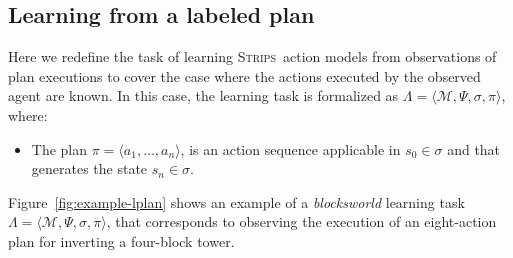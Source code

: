 \documentclass[3p,times]{elsarticle}
\newcommand{\strips}{\textsc{Strips}}     %
\newcommand{\tup}[1]{{\langle #1 \rangle}}
\begin{document}
\subsection{Learning from a labeled plan}
Here we redefine the task of learning \strips\ action models from observations of plan executions to cover the case where the actions executed by the observed agent are known. In this case, the learning task is formalized as $\Lambda=\tup{\mathcal{M},\Psi,\sigma,\pi}$, where:
\begin{itemize}
\item The plan $\pi=\tup{a_1, \ldots, a_n}$, is an action sequence applicable in $s_0\in\sigma$ and that generates the state $s_n\in\sigma$.
\end{itemize}

Figure~\ref{fig:example-lplan} shows an example of a {\em blocksworld} learning task $\Lambda=\tup{\mathcal{M},\Psi,\sigma,\pi}$, that corresponds to observing the execution of an eight-action plan for inverting a four-block tower.
\end{document}
